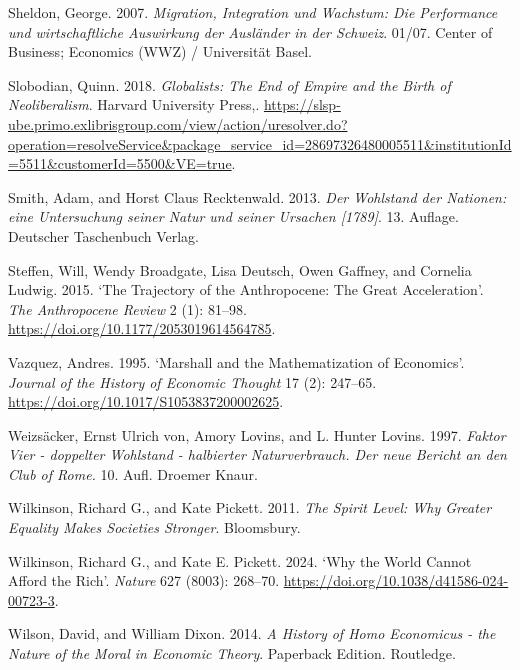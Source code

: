 \documentclass[
  british,
  a4paper,
  DIV=11,
  numbers=noendperiod,
  oneside,
  openany]{scrreprt}
\newlength{\cslhangindent}
\newenvironment{CSLReferences}[2] %
 {\begin{list}{}{%
  \setlength{\itemindent}{0pt}
  \setlength{\leftmargin}{0pt}
  \setlength{\parsep}{0pt}
  \ifodd #1
   \setlength{\leftmargin}{\cslhangindent}
   \setlength{\itemindent}{-1\cslhangindent}
  \fi
  \setlength{\itemsep}{#2\baselineskip}}}
 {\end{list}}
\begin{document}
\begin{CSLReferences}{1}{1}
Sheldon, George. 2007. \emph{Migration, Integration und Wachstum: Die
Performance und wirtschaftliche Auswirkung der Ausländer in der
Schweiz}. 01/07. Center of Business; Economics (WWZ) / Universität
Basel.

Slobodian, Quinn. 2018. \emph{Globalists: The End of Empire and the
Birth of Neoliberalism}. Harvard University Press,.
\url{https://slsp-ube.primo.exlibrisgroup.com/view/action/uresolver.do?operation=resolveService&package_service_id=28697326480005511&institutionId=5511&customerId=5500&VE=true}.

Smith, Adam, and Horst Claus Recktenwald. 2013. \emph{Der Wohlstand der
Nationen: eine Untersuchung seiner Natur und seiner Ursachen
{[}1789{]}}. 13. Auflage. Deutscher Taschenbuch Verlag.

Steffen, Will, Wendy Broadgate, Lisa Deutsch, Owen Gaffney, and Cornelia
Ludwig. 2015. {`The Trajectory of the Anthropocene: The Great
Acceleration'}. \emph{The Anthropocene Review} 2 (1): 81--98.
\url{https://doi.org/10.1177/2053019614564785}.

Vazquez, Andres. 1995. {`Marshall and the Mathematization of
Economics'}. \emph{Journal of the History of Economic Thought} 17 (2):
247--65. \url{https://doi.org/10.1017/S1053837200002625}.

Weizsäcker, Ernst Ulrich von, Amory Lovins, and L. Hunter Lovins. 1997.
\emph{Faktor Vier - doppelter Wohlstand - halbierter Naturverbrauch. Der
neue Bericht an den Club of Rome.} 10. Aufl. Droemer Knaur.

Wilkinson, Richard G., and Kate Pickett. 2011. \emph{The Spirit Level:
Why Greater Equality Makes Societies Stronger}. Bloomsbury.

Wilkinson, Richard G., and Kate E. Pickett. 2024. {`Why the World Cannot
Afford the Rich'}. \emph{Nature} 627 (8003): 268--70.
\url{https://doi.org/10.1038/d41586-024-00723-3}.

Wilson, David, and William Dixon. 2014. \emph{A History of Homo
Economicus - the Nature of the Moral in Economic Theory}. Paperback
Edition. Routledge.


\end{CSLReferences}
\end{document}
